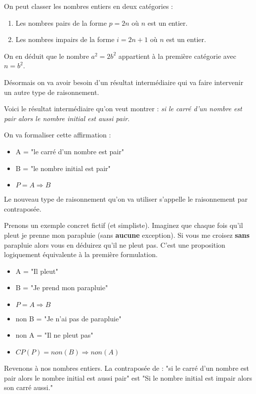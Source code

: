 \documentclass[11pt]{article}
\begin{document}
On peut classer les nombres entiers en deux catégories :
\begin{enumerate}
\item Les nombres pairs de la forme \(p = 2n\) où \(n\) est un entier.
\item Les nombres impairs de la forme \(i = 2n + 1\) où \(n\) est un
entier.
\end{enumerate}

On en déduit que le nombre \(a^2 = 2b^2\) appartient à la première
catégorie avec \(n = b^2\).

Désormais on va avoir besoin d'un résultat intermédiaire qui va
faire intervenir un autre type de raisonnement.

Voici le résultat intermédiaire qu'on veut montrer : \emph{si le carré
d'un nombre est pair alors le nombre initial est aussi pair}.

On va formaliser cette affirmation :
\begin{itemize}
\item A = "le carré d'un nombre est pair"
\item B = "le nombre initial est pair"
\item \(P = A\Rightarrow B\)
\end{itemize}

Le nouveau type de raisonnement qu'on va utiliser s'appelle le
raisonnement par contraposée.

Prenons un exemple concret fictif (et simpliste). Imaginez que
chaque fois qu'il pleut je prenne mon parapluie (sans \textbf{aucune}
exception). Si vous me croisez \textbf{sans} parapluie alors vous en
déduirez qu'il ne pleut pas. C'est une proposition logiquement
équivalente à la première formulation.

\begin{itemize}
\item A = "Il pleut"
\item B = "Je prend mon parapluie"
\item \(P = A\Rightarrow B\)
\item non B = "Je n'ai pas de parapluie"
\item non A = "Il ne pleut pas"
\item \(CP(P) = non(B)\Rightarrow non(A)\)
\end{itemize}

Revenons à nos nombres entiers. La contraposée de : "si le carré
d'un nombre est pair alors le nombre initial est aussi pair" est
"Si le nombre initial est impair alors son carré aussi."
\end{document}
